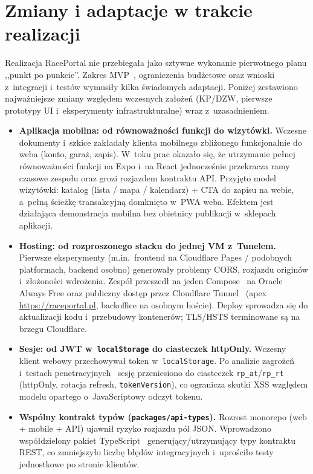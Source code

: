 \documentclass{sprz}
\begin{document}
\section{Zmiany i adaptacje w trakcie realizacji}
Realizacja RacePortal nie przebiegała jako sztywne wykonanie pierwotnego planu ,,punkt po punkcie''. Zakres MVP~\cite{raceportal:mvp}, ograniczenia budżetowe oraz wnioski z~integracji i~testów wymusiły kilka świadomych adaptacji. Poniżej zestawiono najważniejsze zmiany względem wczesnych założeń (KP/DZW, pierwsze prototypy UI i~eksperymenty infrastrukturalne) wraz z~uzasadnieniem.

\begin{itemize}
  \item \textbf{Aplikacja mobilna: od równoważności funkcji do wizytówki.}
  Wczesne dokumenty i~szkice zakładały klienta mobilnego zbliżonego funkcjonalnie do weba (konto, garaż, zapis). W~toku prac okazało się, że utrzymanie pełnej równoważności funkcji na Expo i~na React jednocześnie przekracza ramy czasowe zespołu oraz grozi rozjazdem kontraktu API. Przyjęto model wizytówki: katalog (lista / mapa / kalendarz) + CTA do zapisu na webie, a~pełną ścieżkę transakcyjną domknięto w~PWA weba. Efektem jest działająca demonstracja mobilna bez obietnicy publikacji w~sklepach aplikacji.

  \item \textbf{Hosting: od rozproszonego stacku do jednej VM z~Tunelem.}
  Pierwsze eksperymenty (m.in.\ frontend na Cloudflare Pages / podobnych platformach, backend osobno) generowały problemy CORS, rozjazdu originów i~złożoności wdrożenia. Zespół przeszedł na jeden Compose~\cite{docker:compose} na Oracle Always Free oraz publiczny dostęp przez Cloudflare Tunnel~\cite{cloudflare:tunnel} (apex \url{https://raceportal.pl}, backoffice na osobnym hoście). Deploy sprowadza się do aktualizacji kodu i~przebudowy kontenerów; TLS/HSTS terminowane są na brzegu Cloudflare.

  \item \textbf{Sesje: od JWT w~\texttt{localStorage} do ciasteczek httpOnly.}
  Wczesny klient webowy przechowywał token w~\texttt{localStorage}. Po analizie zagrożeń i~testach penetracyjnych~\cite{raceportal:pentest} sesję przeniesiono do ciasteczek \texttt{rp\_at}/\texttt{rp\_rt} (httpOnly, rotacja refresh, \texttt{tokenVersion}), co ogranicza skutki XSS względem modelu opartego o~JavaScriptowy odczyt tokenu.

  \item \textbf{Wspólny kontrakt typów (\texttt{packages/api-types}).}
  Rozrost monorepo (web + mobile + API) ujawnił ryzyko rozjazdu pól JSON. Wprowadzono współdzielony pakiet TypeScript~\cite{typescript:docs} generujący/utrzymujący typy kontraktu REST, co zmniejszyło liczbę błędów integracyjnych i~uprościło testy jednostkowe po stronie klientów.


\end{itemize}
\end{document}

